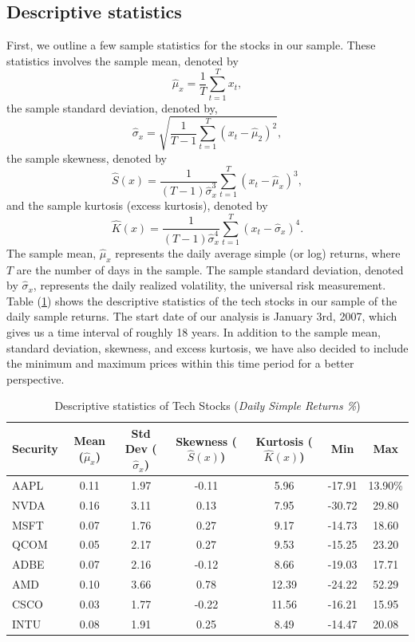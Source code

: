 \documentclass[12pt]{article}
\begin{document}
\subsection{Descriptive statistics}
First, we outline a few sample statistics for the stocks in our sample. These statistics involves the sample mean, denoted by
\begin{equation}
	\hat{\mu}_x=\frac{1}{T}\sum_{t=1}^{T}x_t,
\end{equation}
the sample standard deviation, denoted by,
\begin{equation}
	\hat{\sigma}_x=\sqrt{\frac{1}{T-1}\sum_{t=1}^{T}\left(x_t-\hat{\mu}_2\right)^2},
\end{equation}
the sample skewness, denoted by
\begin{equation}
	\hat{S}(x)=\frac{1}{\left(T-1\right)\hat{\sigma}^3_x}\sum_{t=1}^{T}\left(x_t-\hat{\mu}_x\right)^3,
\end{equation}
and the sample kurtosis (excess kurtosis), denoted by
\begin{equation}
	\hat{K}(x)=\frac{1}{\left(T-1\right)\hat{\sigma}^4_x}\sum_{t=1}^{T}\left(x_t-\hat{\sigma}_x\right)^4.
\end{equation}
The sample mean, $\hat{\mu}_x$ represents the daily average simple (or log) returns, where $T$ are the number of days in the sample. The sample standard deviation, denoted by $\hat{\sigma}_x$, represents the daily realized volatility, the universal risk measurement. Table (\ref{tab:descriptive}) shows the descriptive statistics of the tech stocks in our sample of the daily sample returns. The start date of our analysis is January 3rd, 2007, which gives us a time interval of roughly 18 years. In addition to the sample mean, standard deviation, skewness, and excess kurtosis, we have also decided to include the minimum and maximum prices within this time period for a better perspective.
\begin{table}[ht]
	\centering
	\caption{Descriptive statistics of Tech Stocks (\textit{Daily Simple Returns \%})}
	\begin{tabular}[t]{lcccccc}
		\toprule
		Security & Mean ($\hat{\mu}_x$) & Std Dev ($\hat{\sigma}_x$) & Skewness ($\hat{S}(x)$) & Kurtosis ($\hat{K}(x)$) &Min&Max \\
		\midrule
		AAPL & 0.11 & 1.97 & -0.11 & 5.96 & -17.91 & 13.90\%\\
		NVDA & 0.16 & 3.11 & 0.13 & 7.95 &-30.72&29.80 \\
		MSFT & 0.07 & 1.76 & 0.27 & 9.17 &-14.73&18.60  \\
		QCOM & 0.05 & 2.17 & 0.27 & 9.53 &-15.25&23.20 \\
		ADBE & 0.07	& 2.16 &-0.12 & 8.66 & -19.03 & 17.71 \\	   
		AMD  & 0.10 & 3.66 & 0.78 & 12.39&-24.22&52.29 \\				   
		CSCO  & 0.03 & 1.77 & -0.22 & 11.56 &-16.21&15.95 \\		
		INTU  & 0.08 & 1.91 & 0.25 & 8.49&-14.47&20.08 \\
		\bottomrule
	\end{tabular}\label{tab:descriptive}
\end{table}
\end{document}
